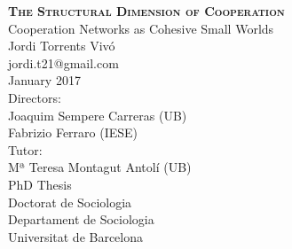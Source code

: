 \begin{titlingpage}
\begin{center}
{\HUGE \textsc{\textbf{The Structural Dimension of Cooperation}}}\\[1cm]
{\LARGE Cooperation Networks as Cohesive Small Worlds}\\[2cm]
{\Large Jordi Torrents Vivó} \\
{\large jordi.t21@gmail.com}\\[1cm]
{\Large January 2017}\\[4cm]
{\large Directors:} \\[0.2cm]
{\Large Joaquim Sempere Carreras (UB)} \\[0.2cm]
{\Large Fabrizio Ferraro (IESE)} \\[0.5cm]
{\large Tutor:} \\[0.2cm]
{\Large Mª Teresa Montagut Antolí (UB)} \\[1.5cm]
{\LARGE PhD Thesis}\\[0.5cm]
{\LARGE Doctorat de Sociologia}\\[2cm]
{\Large Departament de Sociologia} \\[0.5cm]
{\LARGE Universitat de Barcelona}\\
\end{center}
\end{titlingpage}
\cleardoublepage
